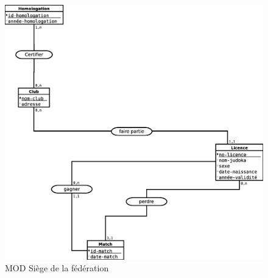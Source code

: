 \begin{figure}[!htb]
    \begin{center}
    \includegraphics[width=11.5cm]{images/cc2_mod2.eps}
    \caption{\label{cc2_mod2} MOD Siège de la fédération}
    \end{center}
\end{figure}

